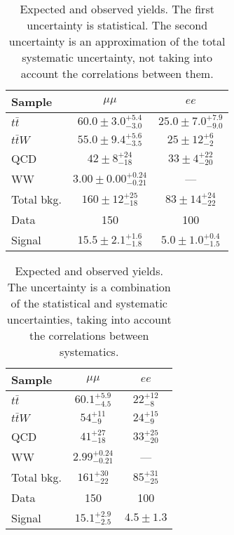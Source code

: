 \begin{table}\begin{center}
\caption{Expected and observed yields. The first uncertainty is statistical. The second uncertainty is an approximation of the total systematic uncertainty, not taking into account the correlations between them.}
\renewcommand{\arraystretch}{1.3}
\begin{tabular}{l *{2}{c}}
\hline\hline
Sample & $\mu\mu$ & $ee$ \\
\hline\hline
$t\bar{t}$ & $60.0 \pm 3.0 ^{+5.4}_{-3.0}$ & $25.0 \pm 7.0 ^{+7.9}_{-9.0}$ \\
\hline
$t\bar{t}W$ & $55.0 \pm 9.4 ^{+5.6}_{-3.5}$ & $25 \pm 12 ^{+6}_{-2}$ \\
\hline
QCD & $42 \pm 8 ^{+24}_{-18}$ & $33 \pm 4 ^{+22}_{-20}$ \\
\hline
WW & $3.00 \pm 0.00 ^{+0.24}_{-0.21}$ &  ---  \\
\hline
\hline
Total bkg. & $160 \pm 12 ^{+25}_{-18}$ & $83 \pm 14 ^{+24}_{-22}$ \\
\hline\hline
Data & 150 & 100 \\
\hline\hline
Signal & $15.5 \pm 2.1 ^{+1.6}_{-1.8}$ & $5.0 \pm 1.0 ^{+0.4}_{-1.5}$ \\
\hline
\end{tabular}
\end{center}\end{table} 

\begin{table}\begin{center}
\caption{Expected and observed yields. The uncertainty is a combination of the statistical and systematic uncertainties, taking into account the correlations between systematics.}
\renewcommand{\arraystretch}{1.3}
\begin{tabular}{l *{2}{c}}
\hline\hline
Sample & $\mu\mu$ & $ee$ \\
\hline\hline
$t\bar{t}$ & $60.1 ^{+5.9}_{-4.5}$ & $22 ^{+12}_{-8}$ \\
\hline
$t\bar{t}W$ & $54 ^{+11}_{-9}$ & $24 ^{+15}_{-9}$ \\
\hline
QCD & $41 ^{+27}_{-18}$ & $33 ^{+25}_{-20}$ \\
\hline
WW & $2.99 ^{+0.24}_{-0.21}$ &  ---  \\
\hline
\hline
Total bkg. & $161 ^{+30}_{-22}$ & $85 ^{+31}_{-25}$ \\
\hline\hline
Data & 150 & 100 \\
\hline\hline
Signal & $15.1 ^{+2.9}_{-2.5}$ & $4.5 \pm 1.3$ \\
\hline
\end{tabular}
\end{center}\end{table} 

